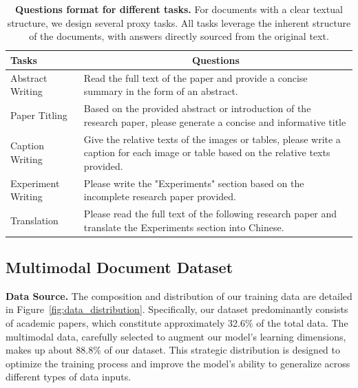 \documentclass[10pt,twocolumn,letterpaper]{article}
\begin{document}
\begin{CJK}{UTF8}{gbsn}
\begin{table}[]
\small
\begin{tabular}{lp{4.7cm}}
\toprule
Tasks             & \multicolumn{1}{c}{Questions} \\ 
\midrule
Abstract Writing    &  
Read the full text of the paper and provide a concise summary in the form of an abstract.     
\\
\midrule
Paper Titling      &  Based on the provided abstract or introduction of the research paper, please generate a concise and informative title          \\
\midrule
Caption Writing    &  Give the relative texts of the images or tables, please write a caption for each image or table based on the relative texts provided.   \\
\midrule
Experiment Writing &  Please write the "Experiments" section based on the incomplete research paper provided.       \\
\midrule
Translation        &  Please read the full text of the following research paper and translate the Experiments section into Chinese.         \\
\bottomrule
\end{tabular}
\caption{\textbf{Questions format for different tasks.}
For documents with a clear textual structure, we design several proxy tasks. All tasks leverage the inherent structure of the documents, with answers directly sourced from the original text.
}
\label{tab:task_format}

\vspace{-3mm}

\end{table}

\subsection{Multimodal Document Dataset}

\textbf{Data Source.} 
The composition and distribution of our training data are detailed in Figure~\ref{fig:data_distribution}. Specifically, our dataset predominantly consists of academic papers, which constitute approximately 32.6\% of the total data. The multimodal data, carefully selected to augment our model's learning dimensions, makes up about 88.8\% of our dataset. This strategic distribution is designed to optimize the training process and improve the model's ability to generalize across different types of data inputs.


\end{CJK}
\end{document}

